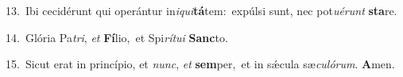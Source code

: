 {\numbfont\textcolor{\numbcolor}{13.}}~Ibi cecidérunt qui operántur in\-\textit{i}\-\textit{qui}\textbf{tá}tem:~\star expúlsi sunt, nec pot\-\textit{u}\-\textit{é}\textit{runt} \textbf{sta}\-re.\par
{\numbfont\textcolor{\numbcolor}{14.}}~Glória Pa\-\textit{tri}\-, \textit{et} \textbf{Fí}\-lio,~\star et Spi\-\textit{rí}\-\textit{tu}\textit{i} \textbf{Sanc}\-to.\par
{\numbfont\textcolor{\numbcolor}{15.}}~Sicut erat in princípio, et \textit{nunc}\-, \textit{et} \textbf{sem}\-per,~\star et in sǽcula sæ\-\textit{cu}\-\textit{ló}\textit{rum}. \textbf{A}\-men.\par
